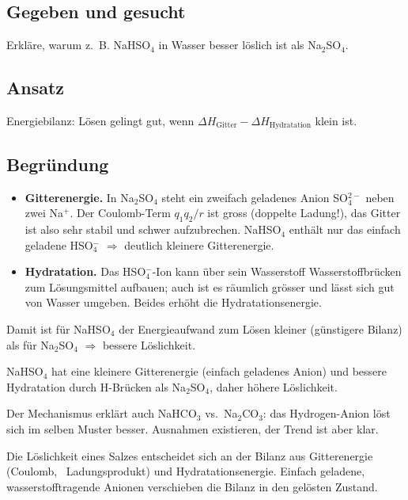 
\subsection*{Gegeben und gesucht}
Erkläre, warum z.~B. NaHSO$_4$ in Wasser besser löslich ist als Na$_2$SO$_4$.

\subsection*{Ansatz}
Energiebilanz: Lösen gelingt gut, wenn
$\Delta H_{\text{Gitter}} - \Delta H_{\text{Hydratation}}$ klein ist.

\subsection*{Begründung}
\begin{itemize}
  \item \textbf{Gitterenergie.} In Na$_2$SO$_4$ steht ein zweifach geladenes
        Anion SO$_4^{2-}$ neben zwei Na$^+$. Der Coulomb-Term
        $q_1 q_2/r$ ist gross (doppelte Ladung!), das Gitter ist also sehr
        stabil und schwer aufzubrechen. NaHSO$_4$ enthält nur das einfach
        geladene HSO$_4^-$ $\Rightarrow$ deutlich kleinere Gitterenergie.
  \item \textbf{Hydratation.} Das HSO$_4^-$-Ion kann über sein Wasserstoff
        Wasserstoffbrücken zum Lösungsmittel aufbauen; auch ist es räumlich
        grösser und lässt sich gut von Wasser umgeben. Beides erhöht die
        Hydratationsenergie.
\end{itemize}
Damit ist für NaHSO$_4$ der Energieaufwand zum Lösen kleiner
(günstigere Bilanz) als für Na$_2$SO$_4$ $\Rightarrow$ bessere Löslichkeit.

\begin{ergebnis}
NaHSO$_4$ hat eine kleinere Gitterenergie (einfach geladenes Anion) und
bessere Hydratation durch H-Brücken als Na$_2$SO$_4$, daher höhere
Löslichkeit.
\end{ergebnis}

\begin{kontrolle}
Der Mechanismus erklärt auch NaHCO$_3$ vs.\ Na$_2$CO$_3$: das Hydrogen-Anion
löst sich im selben Muster besser. Ausnahmen existieren, der Trend ist aber
klar.
\end{kontrolle}

\begin{merksatz}
Die Löslichkeit eines Salzes entscheidet sich an der Bilanz aus
Gitterenergie (Coulomb, ~Ladungsprodukt) und Hydratationsenergie.
Einfach geladene, wasserstofftragende Anionen verschieben die Bilanz in
den gelösten Zustand.
\end{merksatz}
